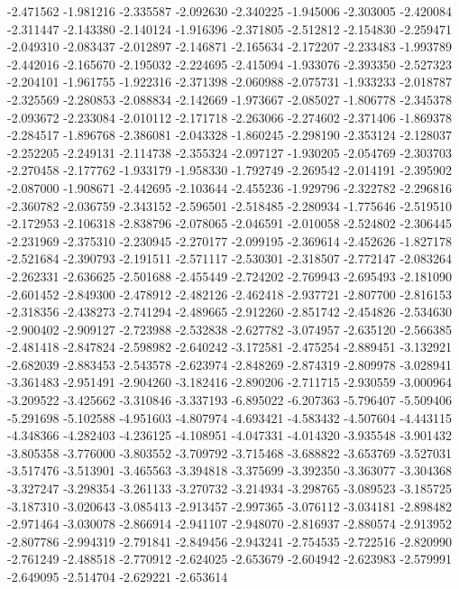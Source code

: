 -2.471562
-1.981216
-2.335587
-2.092630
-2.340225
-1.945006
-2.303005
-2.420084
-2.311447
-2.143380
-2.140124
-1.916396
-2.371805
-2.512812
-2.154830
-2.259471
-2.049310
-2.083437
-2.012897
-2.146871
-2.165634
-2.172207
-2.233483
-1.993789
-2.442016
-2.165670
-2.195032
-2.224695
-2.415094
-1.933076
-2.393350
-2.527323
-2.204101
-1.961755
-1.922316
-2.371398
-2.060988
-2.075731
-1.933233
-2.018787
-2.325569
-2.280853
-2.088834
-2.142669
-1.973667
-2.085027
-1.806778
-2.345378
-2.093672
-2.233084
-2.010112
-2.171718
-2.263066
-2.274602
-2.371406
-1.869378
-2.284517
-1.896768
-2.386081
-2.043328
-1.860245
-2.298190
-2.353124
-2.128037
-2.252205
-2.249131
-2.114738
-2.355324
-2.097127
-1.930205
-2.054769
-2.303703
-2.270458
-2.177762
-1.933179
-1.958330
-1.792749
-2.269542
-2.014191
-2.395902
-2.087000
-1.908671
-2.442695
-2.103644
-2.455236
-1.929796
-2.322782
-2.296816
-2.360782
-2.036759
-2.343152
-2.596501
-2.518485
-2.280934
-1.775646
-2.519510
-2.172953
-2.106318
-2.838796
-2.078065
-2.046591
-2.010058
-2.524802
-2.306445
-2.231969
-2.375310
-2.230945
-2.270177
-2.099195
-2.369614
-2.452626
-1.827178
-2.521684
-2.390793
-2.191511
-2.571117
-2.530301
-2.318507
-2.772147
-2.083264
-2.262331
-2.636625
-2.501688
-2.455449
-2.724202
-2.769943
-2.695493
-2.181090
-2.601452
-2.849300
-2.478912
-2.482126
-2.462418
-2.937721
-2.807700
-2.816153
-2.318356
-2.438273
-2.741294
-2.489665
-2.912260
-2.851742
-2.454826
-2.534630
-2.900402
-2.909127
-2.723988
-2.532838
-2.627782
-3.074957
-2.635120
-2.566385
-2.481418
-2.847824
-2.598982
-2.640242
-3.172581
-2.475254
-2.889451
-3.132921
-2.682039
-2.883453
-2.543578
-2.623974
-2.848269
-2.874319
-2.809978
-3.028941
-3.361483
-2.951491
-2.904260
-3.182416
-2.890206
-2.711715
-2.930559
-3.000964
-3.209522
-3.425662
-3.310846
-3.337193
-6.895022
-6.207363
-5.796407
-5.509406
-5.291698
-5.102588
-4.951603
-4.807974
-4.693421
-4.583432
-4.507604
-4.443115
-4.348366
-4.282403
-4.236125
-4.108951
-4.047331
-4.014320
-3.935548
-3.901432
-3.805358
-3.776000
-3.803552
-3.709792
-3.715468
-3.688822
-3.653769
-3.527031
-3.517476
-3.513901
-3.465563
-3.394818
-3.375699
-3.392350
-3.363077
-3.304368
-3.327247
-3.298354
-3.261133
-3.270732
-3.214934
-3.298765
-3.089523
-3.185725
-3.187310
-3.020643
-3.085413
-2.913457
-2.997365
-3.076112
-3.034181
-2.898482
-2.971464
-3.030078
-2.866914
-2.941107
-2.948070
-2.816937
-2.880574
-2.913952
-2.807786
-2.994319
-2.791841
-2.849456
-2.943241
-2.754535
-2.722516
-2.820990
-2.761249
-2.488518
-2.770912
-2.624025
-2.653679
-2.604942
-2.623983
-2.579991
-2.649095
-2.514704
-2.629221
-2.653614
